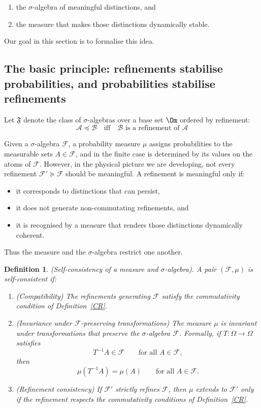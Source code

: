 \documentclass[
 amsmath,amssymb,
  onecolumn %
]{revtex4-2}
\newtheorem{definition}[theorem]{Definition}
\newcommand{\Ff}{{\mathcal F}}  %
\newcommand{\Aa}{{\mathcal A}}  %
\newcommand{\Bb}{{\mathcal B}}
\begin{document}
\begin{enumerate}[leftmargin=2em]
\item the $\sigma$-algebra of meaningful distinctions, and
\item	the measure that makes those distinctions dynamically stable.
\end{enumerate}


Our goal in this section is to formalise this idea.

\subsection{The basic principle: refinements stabilise probabilities,
and probabilities stabilise refinements} 
Let $\mathfrak{F}$ denote the class of $\sigma$-algebras over a base set $\Om$ 
ordered by refinement:
$$
\Aa \preceq \Bb \quad \text{iff} \quad \Bb \text{ is a refinement of } \Aa
$$

Given a $\sigma$-algebra $\mathcal F$, a probability measure $\mu$
assigns probabilities to the measurable sets $A\in\mathcal F$,
and in the finite case is determined by its values on the atoms of
$\mathcal F$. However, in the physical picture we are developing, not every refinement $\Ff' \succeq \Ff$ should be meaningful. A refinement is meaningful only if:
\begin{itemize}[leftmargin=2em]
\item it corresponds to distinctions that can persist,
\item it does not generate non-commutating refinements, and
\item it is recognised by a measure that renders those distinctions dynamically coherent.
\end{itemize}
Thus the measure and the $\sigma$-algebra restrict one another.

\begin{definition}\label{def:invariant}
(Self-consistency of a measure and $\sigma$-algebra).
A pair $(\mathcal F,\mu)$ is \emph{self-consistent} if:

\begin{enumerate}[leftmargin=2em]
\item (Compatibility)
The refinements generating $\mathcal F$ satisfy the commutativity
condition of Definition~\ref{CR}.

\item (Invariance under $\mathcal F$-preserving transformations)
The measure $\mu$ is invariant under transformations that preserve the
$\sigma$-algebra $\mathcal F$.  Formally, if
$T:\Omega\to\Omega$ satisfies
\[
T^{-1}A \in \mathcal F \qquad\text{for all } A\in\mathcal F ,
\]
then
\[
\mu(T^{-1}A)=\mu(A)
\qquad\text{for all }A\in\mathcal F .
\]

\item (Refinement consistency)
If $\mathcal F'$ strictly refines $\mathcal F$, then $\mu$ extends to
$\mathcal F'$ only if the refinement respects the commutativity
conditions of Definition~\ref{CR}.

\end{enumerate}
\end{definition}
\end{document}
